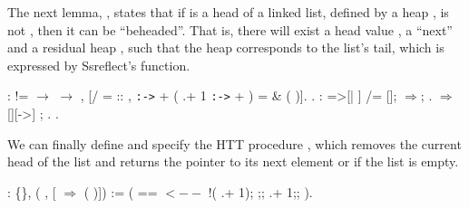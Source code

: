 The next lemma, , states that if  is a head of a linked list,
defined by a heap , is not , then it can be ``beheaded''. That
is, there will exist a head value , a ``next''  and a residual
heap , such that the heap  corresponds to the list's tail,
which is expressed by Ssreflect's  function.
\begin{coqdoccode}
\coqdocemptyline
\coqdocnoindent
{}     : \coqdoceol
\coqdocindent{4.00em}
 !=  \ensuremath{\rightarrow}      \ensuremath{\rightarrow} \coqdoceol
\coqdocindent{4.00em}
   , \coqdoceol
\coqdocindent{5.00em}
[/  =  ::  , \coqdoceol
\coqdocindent{7.00em}
 \texttt{:->}  + ( .+ 1 \texttt{:->}  + ) =  \&     ( )].\coqdoceol
\coqdocnoindent
{}.\coqdoceol
\coqdocnoindent
{}: =>[| ] /=  [];   \ensuremath{\Rightarrow};     .\coqdoceol
\coqdocnoindent
{} \ensuremath{\Rightarrow} [][->] ; .\coqdoceol
\coqdocnoindent
{}.\coqdoceol
\coqdocemptyline
\end{coqdoccode}


We can finally define and specify the HTT procedure , which
removes the current head of the list and returns the pointer to its
next element or  if the list is empty.
\begin{coqdoccode}
\coqdocemptyline
\coqdocnoindent
{} \coqdoceol
\coqdocnoindent
{}  : \{\},  (  , [  \ensuremath{\Rightarrow}   ( )]) :=\coqdoceol
\coqdocindent{1.00em}
 (  ==     \coqdoceol
\coqdocindent{3.00em}
  $\mathtt{<--}$ !( .+ 1);\coqdoceol
\coqdocindent{5.50em}
 ;; \coqdoceol
\coqdocindent{5.50em}
  .+ 1;;\coqdoceol
\coqdocindent{5.50em}
 ).\coqdoceol
\coqdocemptyline
\end{coqdoccode}


